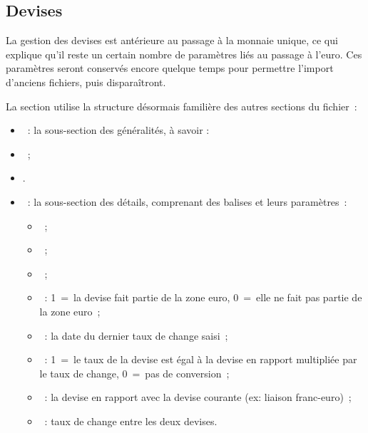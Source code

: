 \subsection{Devises\label{xml-currencies} }

La gestion des devises est antérieure au passage à la monnaie unique, ce qui
explique qu'il reste un certain nombre de paramètres liés au passage à l'euro. 
Ces paramètres seront conservés encore quelque temps pour permettre l'import 
d'anciens fichiers, puis disparaîtront.

La section  utilise la structure désormais familière des autres
sections du fichier~:

\begin{itemize}

\item {}~: la sous-section des généralités, à savoir
:

\item {}~;

\item {}.

\item {}~: la sous-section 
des détails, comprenant des balises   et leurs paramètres~:

\begin{itemize}

\item {}~;

\item {}~;

\item {}~;

\item {}~: 1~=~la devise fait partie de la zone euro, 0~=~elle ne fait
pas partie de la zone euro~;

\item {}~: la date du dernier taux de change saisi~;

\item {}~: 1~=~le taux de la devise est égal à la 
devise en 
rapport multipliée par le taux de change, 0~=~pas de conversion~;

\item {}~: la devise en rapport avec la devise courante 
(ex: liaison franc-euro)~;

\item {}~: taux de change entre les deux devises.

\end{itemize}

\end{itemize}

